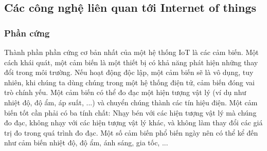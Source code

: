 
\subsection{Các công nghệ liên quan tới Internet of things}
\subsubsection{Phần cứng}
Thành phần phần cứng cơ bản nhất của một hệ thống IoT là các cảm biến. Một cách khái quát, một cảm biến là một thiết bị có khả năng phát hiện những thay đổi trong môi trường. Nếu hoạt động độc lập, một cảm biến sẽ là vô dụng, tuy nhiên, khi chúng ta dùng chúng trong một hệ thống điện tử, cảm biến đóng vai trò chính yếu. Một cảm biến  có thể đo đạc một hiện tượng vật lý (ví dụ như nhiệt độ, độ ẩm, áp suất, ...) và chuyển chúng thành các tín hiệu điện. Một cảm biến tốt cần phải có ba tính chất: Nhạy bén với các hiện tượng vật lý mà chúng đo đạc, không nhạy với các hiện tượng vật lý khác, và không làm thay đổi các giá trị đo trong quá trình đo đạc. Một số cảm biến phổ biến ngày nên có thể kể đến như cảm biến nhiệt độ, độ ẩm, ánh sáng, gia tốc, ... 

